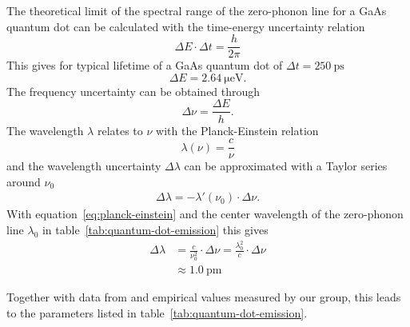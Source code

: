 \newpage

The theoretical limit of the spectral range of the zero-phonon line for a GaAs quantum dot can be calculated with the time-energy uncertainty relation
\begin{equation}
\Delta E \cdot \Delta t = \frac{h}{2 \pi}
\end{equation}
This gives for typical lifetime of a GaAs quantum dot of $\Delta t = \SI{250}{\pico \second}$
\begin{equation}
\Delta E = \SI{2.64}{\micro \electronvolt}.
\end{equation}
The frequency uncertainty can be obtained through
\begin{equation}
\label{eq:planck-einstein}
\Delta \nu = \frac{\Delta E}{h}.
\end{equation}
The wavelength $\lambda$ relates to $\nu$ with the Planck-Einstein relation
\begin{equation}
\lambda(\nu) = \frac{c}{\nu}
\end{equation}
and the wavelength uncertainty $\Delta \lambda$ can be approximated with a Taylor series around $\nu_0$
\begin{align}
\Delta \lambda = - \lambda'(\nu_0)\cdot \Delta \nu.
\end{align}
With equation~\eqref{eq:planck-einstein} and the center wavelength of the zero-phonon line $\lambda_{0}$ in table~\ref{tab:quantum-dot-emission} this gives
\begin{align}
\Delta \lambda &= \frac{c}{\nu_0^2} \cdot \Delta \nu = \frac{\lambda_0^2}{c}\cdot\Delta \nu\\
\label{eq:zero-phonon-theoretical-limit}
&\approx \SI{1.0}{\pico \metre}
\end{align}

Together with data from \textcite{scholl_resonance_2019} and empirical values measured by our group, this leads to the parameters listed in table~\ref{tab:quantum-dot-emission}.

